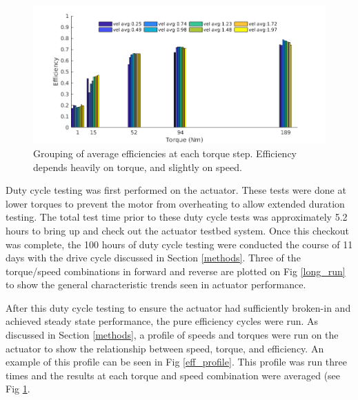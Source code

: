 
\begin{figure}[t]
   \centering
   \includegraphics[width=\linewidth]{images/eff_test_bar_plot_v3}
   \caption{Grouping of average efficiencies at each torque step.
   Efficiency depends heavily on torque, and slightly on speed.}
   \label{eff_results}
\end{figure}

Duty cycle testing was first performed on the actuator.
These tests were done at lower torques to prevent the motor from overheating to allow extended duration testing.
The total test time prior to these duty cycle tests was approximately 5.2 hours to bring up and check out the actuator testbed system.
Once this checkout was complete, the 100 hours of duty cycle testing were conducted the course of 11 days with the drive cycle discussed in Section \ref{methods}.
Three of the torque/speed combinations in forward and reverse are plotted on Fig \ref{long_run} to show the general characteristic trends seen in actuator performance.

After this duty cycle testing to ensure the actuator had sufficiently broken-in and achieved steady state performance, the pure efficiency cycles were run.
As discussed in Section \ref{methods}, a profile of speeds and torques were run on the actuator to show the relationship between speed, torque, and efficiency.
An example of this profile can be seen in Fig \ref{eff_profile}.
This profile was run three times and the results at each torque and speed combination were averaged (see Fig \ref{eff_results}.
